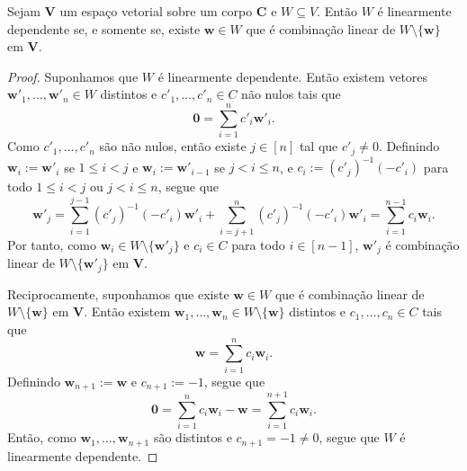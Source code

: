 \begin{prop}
	Sejam $\bm V$ um espaço vetorial sobre um corpo $\bm C$ e $W \subseteq V$. Então $W$ é linearmente dependente se, e somente se, existe $\bm w \in W$ que é combinação linear de $W \setminus \{\bm w\}$ em $\bm V$.
\end{prop}
\begin{proof}
	Suponhamos que $W$ é linearmente dependente. Então existem vetores $\bm w'_1,\ldots,\bm w'_n \in W$ distintos e $c'_1,\ldots,c'_n \in C$ não nulos tais que
	\begin{equation*}
	\bm 0 = \sum_{i=1}^n c'_i \bm w'_i.
	\end{equation*}
Como $c'_1,\ldots,c'_n$ são não nulos, então existe $j \in [n]$ tal que $c'_j \neq 0$. Definindo $\bm w_i := \bm w'_i$ se $1 \leq i < j$ e $\bm w_i := \bm w'_{i-1}$ se $j < i \leq n$, e $c_i := (c'_j)^{-1}(-c'_i)$ para todo $1 \leq i < j$ ou $j < i \leq n$, segue que
	\begin{equation*}
	\bm w'_j = \sum_{i=1}^{j-1} (c'_j)^{-1}(-c'_i) \bm w'_i + \sum_{i=j+1}^n (c'_j)^{-1}(-c'_i) \bm w'_i = \sum_{i=1}^{n-1} c_i \bm w_i.
	\end{equation*}
Por tanto, como $\bm w_i \in W \setminus \{\bm w'_j\}$ e $c_i \in C$ para todo $i \in [n-1]$, $\bm w'_j$ é combinação linear de $W \setminus \{\bm w'_j\}$ em $\bm V$.

	Reciprocamente, suponhamos que existe $\bm w \in W$ que é combinação linear de $W \setminus \{\bm w\}$ em $\bm V$. Então existem $\bm w_1, \ldots, \bm w_n \in W \setminus \{\bm w\}$ distintos e $c_1, \ldots, c_n \in C$ tais que
	\begin{equation*}
	\bm w = \sum_{i=1}^n c_i \bm w_i.
	\end{equation*}
Definindo $\bm w_{n+1} := \bm w$ e $c_{n+1} := -1$, segue que
	\begin{equation*}
	\bm 0 = \sum_{i=1}^n c_i \bm w_i - \bm w = \sum_{i=1}^{n+1} c_i \bm w_i.
	\end{equation*}
Então, como $\bm w_1, \ldots, \bm w_{n+1}$ são distintos e $c_{n+1} = -1 \neq 0$, segue que $W$ é linearmente dependente.
\end{proof}

